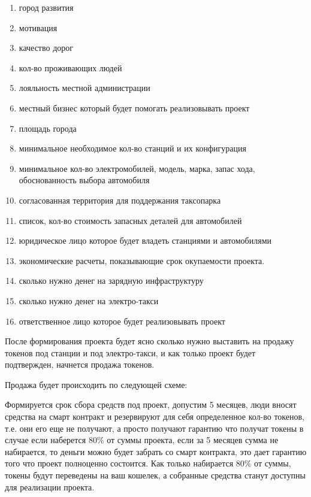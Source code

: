 \documentclass[a4paper,12pt]{report}
\begin{document}
\begin{enumerate}
	
	\item город развития
	\item мотивация
	\item качество дорог
	\item кол-во проживающих людей 
	\item лояльность местной администрации
	\item местный бизнес который будет помогать реализовывать проект
	\item площадь города
	\item минимальное необходимое кол-во станций и их конфигурация
	\item минимальное кол-во электромобилей, модель, марка, запас хода, обоснованность выбора автомобиля
	\item согласованная территория для поддержания таксопарка
	\item список, кол-во стоимость запасных деталей для автомобилей
	\item юридическое лицо которое будет владеть станциями и автомобилями
	\item экономические расчеты, показывающие срок окупаемости проекта. 
	\item сколько нужно денег на зарядную инфраструктуру
	\item сколько нужно денег на электро-такси
	\item ответственное лицо которое будет реализовывать проект

\end{enumerate}
 
После формирования проекта будет ясно сколько нужно выставить на продажу токенов под станции и под электро-такси, и как только проект будет подтвержден, начнется продажа токенов.

Продажа будет происходить по следующей схеме:

Формируется срок сбора средств под проект, допустим 5 месяцев, люди вносят средства на смарт контракт и резервируют для себя определенное кол-во токенов, т.е. они его еще не получают, а просто получают гарантию что получат токены в случае если наберется 80\% от суммы проекта, если за 5 месяцев сумма не набирается, то деньги можно будет забрать со смарт контракта, это дает гарантию того что проект полноценно состоится. Как только набирается 80\% от суммы, токены будут переведены на ваш кошелек, а собранные средства станут доступны для реализации проекта. 
\end{document}
